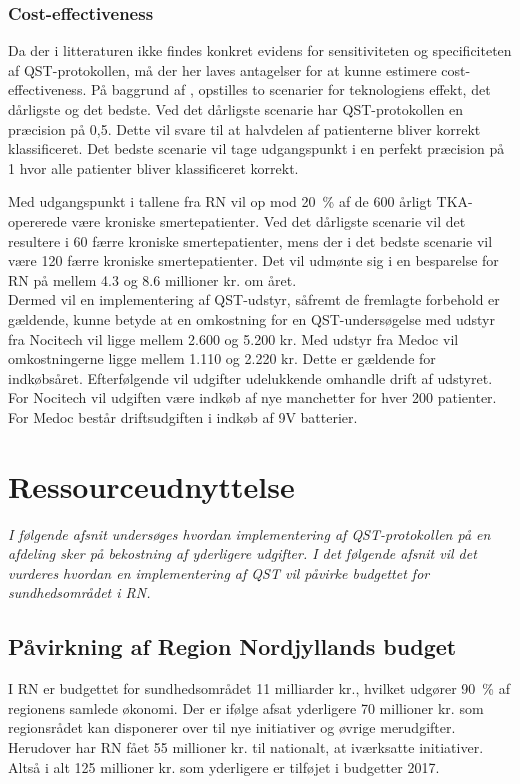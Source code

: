 \subsubsection{Cost-effectiveness}
Da der i litteraturen ikke findes konkret evidens for sensitiviteten og specificiteten af QST-protokollen, må der her laves antagelser for at kunne estimere cost-effectiveness. På baggrund af , opstilles to scenarier for teknologiens effekt, det dårligste og det bedste. Ved det dårligste scenarie har QST-protokollen en præcision på 0,5. Dette vil svare til at halvdelen af patienterne bliver korrekt klassificeret. Det bedste scenarie vil tage udgangspunkt i en perfekt præcision på 1 hvor alle patienter bliver klassificeret korrekt.

Med udgangspunkt i tallene fra RN vil op mod 20~\% af de 600 årligt TKA-opererede være kroniske smertepatienter. Ved det dårligste scenarie vil det resultere i 60 færre kroniske smertepatienter, mens der i det bedste scenarie vil være 120 færre kroniske smertepatienter. Det vil udmønte sig i en besparelse for RN på mellem 4.3 og 8.6 millioner kr. om året. \\
Dermed vil en implementering af QST-udstyr, såfremt de fremlagte forbehold er gældende, kunne betyde at en omkostning for en QST-undersøgelse med udstyr fra Nocitech vil ligge mellem 2.600 og 5.200 kr. Med udstyr fra Medoc vil omkostningerne ligge mellem 1.110 og 2.220 kr. Dette er gældende for indkøbsåret. Efterfølgende vil udgifter udelukkende omhandle drift af udstyret. For Nocitech vil udgiften være indkøb af nye manchetter for hver 200 patienter. For Medoc består driftsudgiften i indkøb af 9V batterier. 

\section{Ressourceudnyttelse}
\textit{I følgende afsnit undersøges hvordan implementering af QST-protokollen på en afdeling sker på bekostning af yderligere udgifter. I det følgende afsnit vil det vurderes hvordan en implementering af QST vil påvirke budgettet for sundhedsområdet i RN.}

\subsection{Påvirkning af Region Nordjyllands budget}
I RN er budgettet for sundhedsområdet 11 milliarder kr., hvilket udgører 90~\% af regionens samlede økonomi. \citep{RnBudget17} Der er ifølge  afsat yderligere 70 millioner kr. som regionsrådet kan disponerer over til nye initiativer og øvrige merudgifter. Herudover har RN fået 55 millioner kr. til nationalt, at iværksatte initiativer. Altså i alt 125 millioner kr. som yderligere er tilføjet i budgetter 2017.

